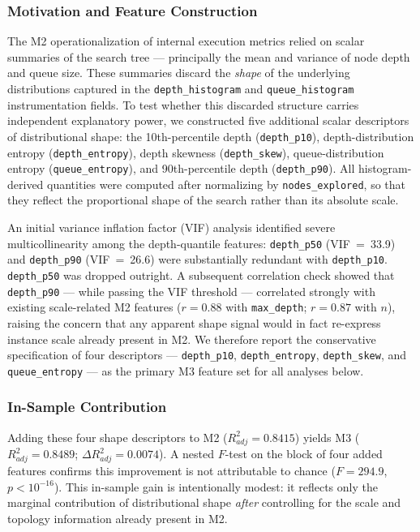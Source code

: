 \documentclass[sigconf]{acmart}
\begin{document}
\subsubsection{Motivation and Feature Construction}
The M2 operationalization of internal execution metrics relied on scalar summaries of the search tree --- principally the mean and variance of node depth and queue size. These summaries discard the \emph{shape} of the underlying distributions captured in the \texttt{depth\_histogram} and \texttt{queue\_histogram} instrumentation fields. To test whether this discarded structure carries independent explanatory power, we constructed five additional scalar descriptors of distributional shape: the 10th-percentile depth (\texttt{depth\_p10}), depth-distribution entropy (\texttt{depth\_entropy}), depth skewness (\texttt{depth\_skew}), queue-distribution entropy (\texttt{queue\_entropy}), and 90th-percentile depth (\texttt{depth\_p90}). All histogram-derived quantities were computed after normalizing by \texttt{nodes\_explored}, so that they reflect the proportional shape of the search rather than its absolute scale.

An initial variance inflation factor (VIF) analysis identified severe multicollinearity among the depth-quantile features: \texttt{depth\_p50} (VIF~=~33.9) and \texttt{depth\_p90} (VIF~=~26.6) were substantially redundant with \texttt{depth\_p10}. \texttt{depth\_p50} was dropped outright. A subsequent correlation check showed that \texttt{depth\_p90} --- while passing the VIF threshold --- correlated strongly with existing scale-related M2 features ($r = 0.88$ with \texttt{max\_depth}; $r = 0.87$ with $n$), raising the concern that any apparent shape signal would in fact re-express instance scale already present in M2. We therefore report the conservative specification of four descriptors --- \texttt{depth\_p10}, \texttt{depth\_entropy}, \texttt{depth\_skew}, and \texttt{queue\_entropy} --- as the primary M3 feature set for all analyses below.

\subsubsection{In-Sample Contribution}
Adding these four shape descriptors to M2 ($R^2_{adj}=0.8415$) yields M3 ($R^2_{adj}=0.8489$; $\Delta R^2_{adj}=0.0074$). A nested $F$-test on the block of four added features confirms this improvement is not attributable to chance ($F=294.9$, $p < 10^{-16}$). This in-sample gain is intentionally modest: it reflects only the marginal contribution of distributional shape \emph{after} controlling for the scale and topology information already present in M2.
\end{document}
